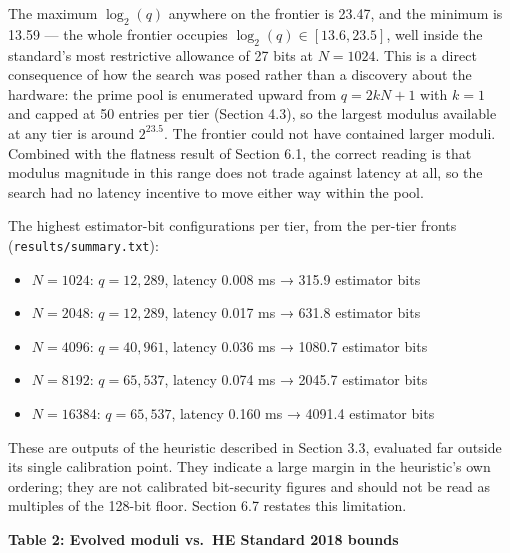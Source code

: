 The maximum \(\log_2(q)\) anywhere on the frontier is 23.47, and the minimum is 13.59 --- the whole frontier occupies \(\log_2(q) \in [13.6, 23.5]\), well inside the standard's most restrictive allowance of 27 bits at \(N = 1024\). This is a direct consequence of how the search was posed rather than a discovery about the hardware: the prime pool is enumerated upward from \(q = 2kN + 1\) with \(k = 1\) and capped at 50 entries per tier (Section 4.3), so the largest modulus available at any tier is around \(2^{23.5}\). The frontier could not have contained larger moduli. Combined with the flatness result of Section 6.1, the correct reading is that modulus magnitude in this range does not trade against latency at all, so the search had no latency incentive to move either way within the pool.

The highest estimator-bit configurations per tier, from the per-tier fronts (\texttt{results/summary.txt}):

\begin{itemize}
\tightlist
\item
  \(N = 1024\): \(q = 12{,}289\), latency 0.008 ms → 315.9 estimator bits
\item
  \(N = 2048\): \(q = 12{,}289\), latency 0.017 ms → 631.8 estimator bits
\item
  \(N = 4096\): \(q = 40{,}961\), latency 0.036 ms → 1080.7 estimator bits
\item
  \(N = 8192\): \(q = 65{,}537\), latency 0.074 ms → 2045.7 estimator bits
\item
  \(N = 16384\): \(q = 65{,}537\), latency 0.160 ms → 4091.4 estimator bits
\end{itemize}

These are outputs of the heuristic described in Section 3.3, evaluated far outside its single calibration point. They indicate a large margin in the heuristic's own ordering; they are not calibrated bit-security figures and should not be read as multiples of the 128-bit floor. Section 6.7 restates this limitation.

\textbf{Table 2: Evolved moduli vs.~HE Standard 2018 bounds}

